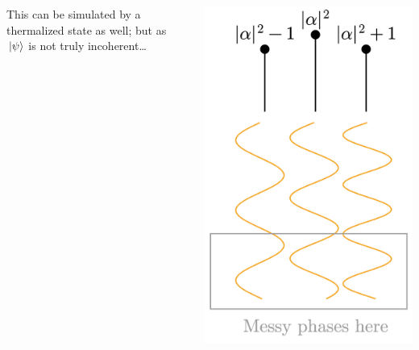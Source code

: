 \documentclass[t]{beamer}
\begin{document}
\begin{frame}
\begin{columns}[T]
\begin{column}{0.7\textwidth}
        This can be simulated by a thermalized state as well; but as $\ket*{\psi}$ is not truly incoherent\dots 
    \end{column}
    \begin{column}{0.3\textwidth}
        \vspace{0.2cm}
        \includegraphics[width=\textwidth]{figs/coherent-different-phases.png}
    \end{column}
\end{columns}

\end{frame}
\end{document}
